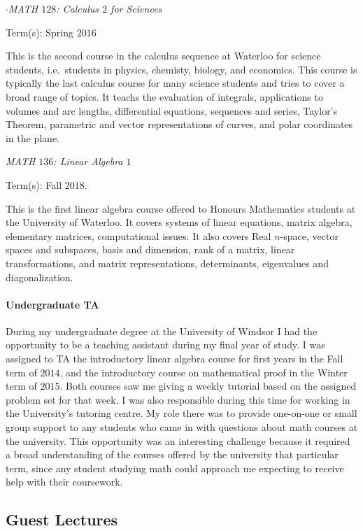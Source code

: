 \documentclass{article}
\begin{document}
\noindent$\cdot$\emph{MATH $128$: Calculus $2$ for Sciences}

Term(s): Spring $2016$

This is the second course in the calculus sequence at Waterloo for science students, i.e.\ students in physics, chemisty, biology, and economics. This course is typically the last calculus course for many science students and tries to cover a broad range of topics. It teachs the evaluation of integrals, applications to volumes and arc lengths, differential equations, sequences and series, Taylor's Theorem, parametric and vector representations of curves, and polar coordinates in the plane.
\bigskip

\noindent\emph{MATH $136$: Linear Algebra $1$}

Term(s): Fall $2018$.

This is the first linear algebra course offered to Honours Mathematics students at the University of Waterloo. It covers systems of linear equations, matrix algebra, elementary matrices, computational issues. It also covers Real $n$-space, vector spaces and subspaces, basis and dimension, rank of a matrix, linear transformations, and matrix representations, determinants, eigenvalues and diagonalization.

\paragraph{Undergraduate TA}During my undergraduate degree at the University of Windsor I had the opportunity to be a teaching assistant during my final year of study. I was assigned to TA the introductory linear algebra course for first years in the Fall term of $2014$, and the introductory course on mathematical proof in the Winter term of $2015$. Both courses saw me giving a weekly tutorial based on the assigned problem set for that week. I was also responsible during this time for working in the University's tutoring centre. My role there was to provide one-on-one or small group support to any students who came in with questions about math courses at the university. This opportunity was an interesting challenge because it required a broad understanding of the courses offered by the university that particular term, since any student studying math could approach me expecting to receive help with their coursework.

\subsection{Guest Lectures}
\end{document}
